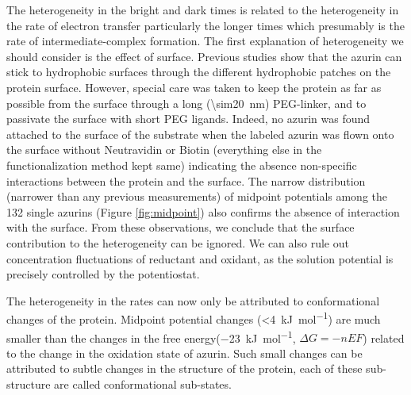 The heterogeneity in the bright and dark times is related to the heterogeneity in the rate of electron transfer particularly the longer times which presumably is the rate of intermediate-complex formation.
The first explanation of heterogeneity we should consider is the effect of surface.
Previous studies show that the azurin can stick to hydrophobic surfaces through the different hydrophobic patches on the protein surface.\cite{patil2010visualizing,salverda2010fluorescent,akkilic2014chemically-induced}
However, special care was taken to keep the protein as far as possible from the surface through a long (\SI{\sim20}{\nm}) PEG-linker, and to passivate the surface with short PEG ligands.
Indeed, no azurin was found attached to the surface of the substrate when the labeled azurin was flown onto the surface without Neutravidin or Biotin (everything else in the functionalization method kept same) indicating the absence non-specific interactions between the protein and the surface.
The narrow distribution (narrower than any previous measurements) of midpoint potentials among the 132 single azurins (Figure \ref{fig:midpoint}) also confirms the absence of interaction with the surface.
From these observations, we conclude that the surface contribution to the heterogeneity can be ignored.
We can also rule out concentration fluctuations of reductant and oxidant, as the solution potential is precisely controlled by the potentiostat.

The heterogeneity in the rates can now only be attributed to conformational changes of the protein.
Midpoint potential changes (\SI{<4}{\kJ\per\mole}) are much smaller than the changes in the free energy(\SI{-23}{\kJ\per\mole}, $\Delta{G}=-nEF$) related to the change in the oxidation state of azurin. Such small changes can be attributed to subtle changes in the structure of the protein, each of these sub-structure are called conformational sub-states. %

